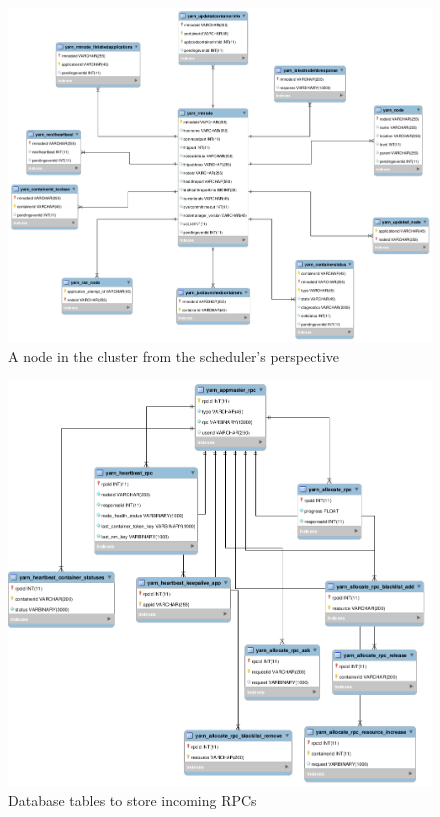 \begin{figure}
\centering
\includegraphics[scale=0.4]{resources/images/Implementation/hops_yarn_ndb_schema_rmnode.png}
\caption{A node in the cluster from the scheduler's perspective}
\label{fig:impl_fk_yarn_rmnode}
\end{figure}

\begin{figure}
\centering
\includegraphics[scale=0.4]{resources/images/Implementation/hops_yarn_ndb_schema_rpc.png}
\caption{Database tables to store incoming RPCs}
\label{fig:impl_fk_yarn_rpc}
\end{figure}


